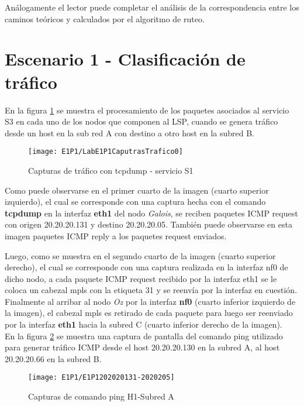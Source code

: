Análogamente el lector puede completar el análisis de la correspondencia entre los caminos te\'oricos y calculados por el algoritmo de ruteo.

\section{Escenario 1 - Clasificación de tr\'afico}
\label{appendix6.2}

En la figura \ref{fig:LabE1P1CapsTraf} se muestra el procesamiento de los paquetes asociados al servicio S3 en cada uno de los nodos que componen al LSP, cuando se genera tr\'afico desde un host en la sub red A con destino a otro host en la subred B.

\begin{figure}[h] 
\centering    
\texttt{[image: E1P1/LabE1P1CaputrasTrafico0]}
\caption[Capturas de tr\'afico con tcpdump - servicio S1]{Capturas de tr\'afico con tcpdump - servicio S1}
\label{fig:LabE1P1CapsTraf}
\end{figure}

Como puede observarse en el primer cuarto de la imagen (cuarto superior izquierdo), el cual se corresponde con una captura hecha con el comando \textbf{tcpdump} en la interfaz \textbf{eth1} del nodo \textit{Galois}, se reciben paquetes ICMP request con origen 20.20.20.131 y destino 20.20.20.05. Tambi\'en puede observarse en esta imagen paquetes ICMP reply a los paquetes request enviados.

Luego, como se muestra en el segundo cuarto de la imagen (cuarto superior derecho), el cual se corresponde con una captura realizada en la interfaz nf0 de dicho nodo, a cada paquete ICMP request recibido por la interfaz eth1 se le coloca un cabezal mpls con la etiqueta 31 y se reenvía por la interfaz en cuestión. Finalmente al arribar al nodo \textit{Oz} por la interfaz \textbf{nf0} (cuarto inferior izquierdo de la imagen), el cabezal mpls es retirado de cada paquete para luego ser reenviado por la interfaz \textbf{eth1} hacia la subred C (cuarto inferior derecho de la imagen).\\

En la figura \ref{fig:LabE1P1CapHost} se muestra una captura de pantalla del comando ping utilizado para generar tr\'afico ICMP desde el host 20.20.20.130 en la subred A, al host 20.20.20.66 en la subred B.

\begin{figure}[h!] 
\centering    
\texttt{[image: E1P1/E1P1202020131-2020205]}
\caption[Capturas de comando ping H1-Subred A]{Capturas de comando ping H1-Subred A}
\label{fig:LabE1P1CapHost}
\end{figure}

